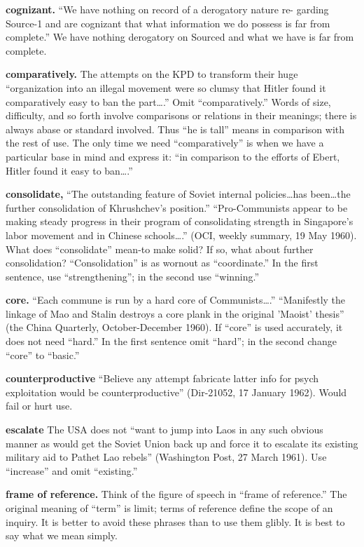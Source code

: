 \documentclass[
    oneside,
    11pt,
    draft
]{memoir}
\begin{document}
\textbf{cognizant.} \enquote{We have nothing on record of a derogatory nature re- garding Source-1 and are cognizant that what information we do possess is far from complete.} We have nothing derogatory on Sourced and what we have is far from complete. 

\textbf{comparatively.} The attempts on the KPD to transform their huge \enquote{organization into an illegal movement were so clumsy that Hitler found it comparatively easy to ban the part\dots.} Omit \enquote{comparatively.} Words of size, difficulty, and so forth involve comparisons or relations in their meanings; there is always abase or standard involved. Thus \enquote{he is tall} means in comparison with the rest of use. The only time we need \enquote{comparatively} is when we have a particular base in mind and express it: \enquote{in comparison to the efforts of Ebert, Hitler found it easy to ban\dots.} 

\textbf{consolidate,} \enquote{The outstanding feature of Soviet internal policies\dots has been\dots the further consolidation of Khrushchev's position.} \enquote{Pro-Communists appear to be making steady progress in their program of consolidating strength in Singapore's labor movement and in Chinese schools\dots.} (OCI, weekly summary, 19 May 1960). What does \enquote{consolidate} mean-to make solid? If so, what about further consolidation? \enquote{Consolidation} is as wornout as \enquote{coordinate.} In the first sentence, use \enquote{strengthening}; in the second use \enquote{winning.} 

\textbf{core.} \enquote{Each commune is run by a hard core of Communists\dots.} \enquote{Manifestly the linkage of Mao and Stalin destroys a core plank in the original 'Maoist' thesis} (the China Quarterly, October-December 1960). If \enquote{core} is used accurately, it does not need \enquote{hard.} In the first sentence omit \enquote{hard}; in the second change \enquote{core} to \enquote{basic.} 

\textbf{counterproductive} \enquote{Believe any attempt fabricate latter info for psych exploitation would be counterproductive} (Dir-21052, 17 January 1962). Would fail or hurt use.

\textbf{escalate} The USA does not \enquote{want to jump into Laos in any such obvious manner as would get the Soviet Union back up and force it to escalate its existing military aid to Pathet Lao rebels} (Washington Post, 27 March 1961). Use \enquote{increase} and omit \enquote{existing.} 

\textbf{frame of reference.} Think of the figure of speech in \enquote{frame of reference.} The original meaning of \enquote{term} is limit; terms of reference define the scope of an inquiry. It is better to avoid these phrases than to use them glibly. It is best to say what we mean simply. 
\end{document}
